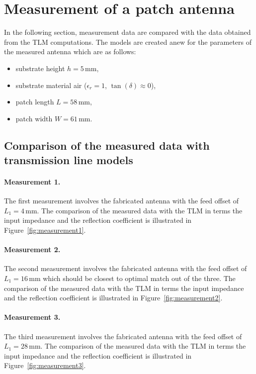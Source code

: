 \documentclass[11pt,a4paper]{article}
\begin{document}
    \section{Measurement of a patch antenna}
        In the following section, measurement data are compared with the data obtained from the TLM computations. The models are created anew for the parameters of the measured antenna which are as follows:
        \begin{itemize}
            \item substrate height $h = 5\, \mathrm{mm}$,
            \item substrate material air ($\epsilon_r = 1$, $\tan(\delta) \approx 0$),
            \item patch length $L = 58\, \mathrm{mm}$,
            \item patch width $W = 61\, \mathrm{mm}$.
        \end{itemize}

        \subsection{Comparison of the measured data with transmission line models}
            \paragraph{Measurement 1.} The first measurement involves the fabricated antenna with the feed offset of $L_1 = 4\, \mathrm{mm}$. The comparison of the measured data with the TLM in terms the input impedance and the reflection coefficient is illustrated in Figure~\ref{fig:measurement1}.

            \paragraph{Measurement 2.} The second measurement involves the fabricated antenna with the feed offset of $L_1 = 16\, \mathrm{mm}$ which should be closest to optimal match out of the three. The comparison of the measured data with the TLM in terms the input impedance and the reflection coefficient is illustrated in Figure~\ref{fig:measurement2}.

            \paragraph{Measurement 3.} The third measurement involves the fabricated antenna with the feed offset of $L_1 = 28\, \mathrm{mm}$. The comparison of the measured data with the TLM in terms the input impedance and the reflection coefficient is illustrated in Figure~\ref{fig:measurement3}.
\end{document}
